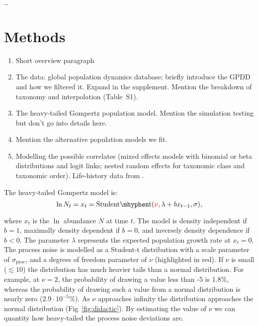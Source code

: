 \documentclass[12pt]{article}
\begin{document}
\citep{doak2008}

\citep{smale2013}

\citep{easterling2000}
\citep{scheffer2003}
\citep{katz2005}

\citep{taleb2007}

\citep{vasseur2014}

\citep{vert-pre2013}
\citep{lindenmayer2010}

\citep{valpine2002}
\citep{gregory2010}
\citet{garcia-carreras2011}
\citet{brook2006}
\citep{herrandoprez2014}

\citep{sibly2005, ziebarth2010}

\ldots

\section{Methods}

\begin{enumerate}
  \item Short overview paragraph
  \item The data: global population dynamics database; briefly introduce the GPDD and how we filtered it. Expand in the supplement. Mention the breakdown of taxonomy and interpolation (Table~S1).
  \item The heavy-tailed Gompertz population model. Mention the simulation testing but don't go into details here.
  \item Mention the alternative population models we fit.
  \item Modelling the possible correlates (mixed effects models with binomial or beta distributions and logit links; nested random effects for taxonomic class and taxonomic order). Life-history data from \citet{brook2006a}.
  \end{enumerate}


The heavy-tailed Gompertz model is:
\begin{equation*}
\ln N_t = x_t = \mathrm{Student\mhyphen t}( {\color{red} \nu }, \lambda + b x_{t-1}, \sigma),
\end{equation*}

\noindent where $x_t$ is the $\ln$ abundance $N$ at time $t$. The model is density independent if $b = 1$, maximally density dependent if $b = 0$, and inversely density dependence if $b < 0$. The parameter $\lambda$ represents the expected population growth rate at $x_t = 0$. The process noise is modelled as a Student-t distribution with a scale parameter of $\sigma_\mathrm{proc}$, and a degrees of freedom parameter of $\nu$ (highlighted in red). If $\nu$ is small ($\lesssim 10$) the distribution has much heavier tails than a normal distribution.  For example, at $\nu = 2$, the probability of drawing a value less than -5 is 1.8\%, whereas the probability of drawing such a value from a normal distribution is nearly zero ($2.9\cdot10^{-5}$\%). As $\nu$ approaches infinity the distribution approaches the normal distribution (Fig~\ref{fig:didactic}). By estimating the value of $\nu$ we can quantity how heavy-tailed the process noise deviations are.
\end{document}
